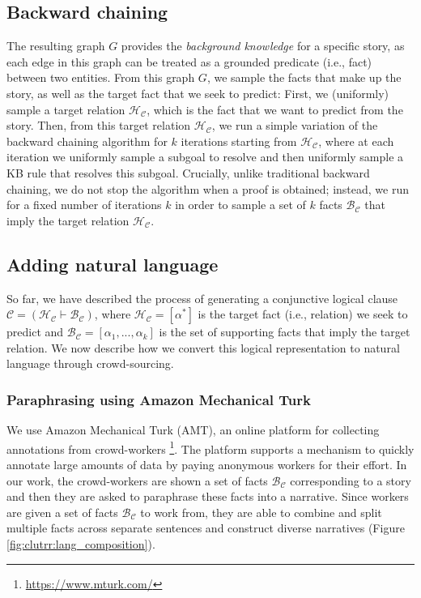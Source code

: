 \documentclass[letterpaper, 12pt]{report}
\begin{document}
\subsection{Backward chaining}
The resulting graph $G$ provides the \textit{background knowledge} for a specific story, as each edge in this graph can be treated as a grounded predicate (i.e., fact) between two entities.
From this graph $G$, we sample the facts that make up the story, as well as the target fact that we seek to predict:
First, we (uniformly) sample a target relation $\mathcal{H}_{\mathcal{C}}$, which is the fact that we want to predict from the story.
Then, from this target relation $\mathcal{H}_{\mathcal{C}}$,  we run a simple variation of the backward chaining \citep{gallaire1978logic} algorithm for $k$ iterations starting from $\mathcal{H}_{\mathcal{C}}$, where at each iteration we uniformly sample a subgoal to resolve and then uniformly sample a KB rule that resolves this subgoal.
Crucially, unlike traditional backward chaining, we do not stop the algorithm when a proof is obtained; instead, we run for a fixed number of iterations $k$ in order to sample a set of $k$ facts $\mathcal{B}_{\mathcal{C}}$ that imply the target relation $\mathcal{H}_{\mathcal{C}}$.

\subsection{Adding natural language}
\label{subsec:clutrr_nat_lang}

So far, we have described the process of generating a  conjunctive logical clause $\mathcal{C}=(\mathcal{H}_{\mathcal{C}} \vdash \mathcal{B}_{\mathcal{C}})$, where $\mathcal{H}_{\mathcal{C}}=[\alpha^*]$ is the target fact (i.e., relation) we seek to predict and $\mathcal{B}_{\mathcal{C}} = [\alpha_1, ..., \alpha_k]$ is the set of supporting facts that imply the target relation.
We now describe how we convert this logical representation to natural language through crowd-sourcing.

\subsubsection{Paraphrasing using Amazon Mechanical Turk}

We use Amazon Mechanical Turk (AMT), an online platform for collecting annotations from crowd-workers \footnote{\href{https://www.mturk.com/}{https://www.mturk.com/}}. The platform supports a mechanism to quickly annotate large amounts of data by paying anonymous workers for their effort. In our work, the crowd-workers are shown a set of facts $\mathcal{B}_{\mathcal{C}}$ corresponding to a story and then they are asked to paraphrase these facts into a narrative.
Since workers are given a set of facts $\mathcal{B}_{\mathcal{C}}$ to work from, they are able to combine and split multiple facts across separate sentences and construct diverse narratives (Figure \ref{fig:clutrr:lang_composition}).
\end{document}
